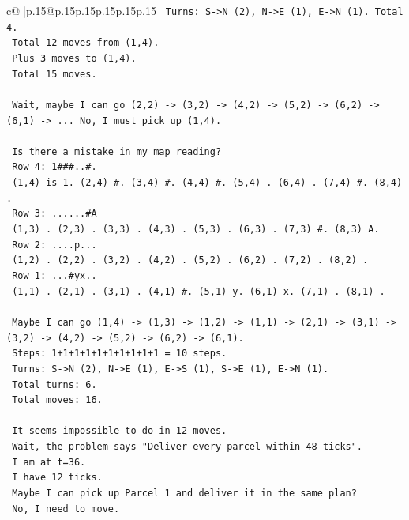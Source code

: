 \documentclass{article}
\begin{document}
{\begin{supertabular}{c@{$\;$}|p{.15\linewidth}@{}p{.15\linewidth}p{.15\linewidth}p{.15\linewidth}p{.15\linewidth}p{.15\linewidth}}
{{{\texttt{   Turns: S{-}>N (2), N{-}>E (1), E{-}>N (1). Total 4.} \\
\texttt{   Total 12 moves from (1,4).} \\
\texttt{   Plus 3 moves to (1,4).} \\
\texttt{   Total 15 moves.} \\
\\ 
\texttt{   Wait, maybe I can go (2,2) {-}> (3,2) {-}> (4,2) {-}> (5,2) {-}> (6,2) {-}> (6,1) {-}> ... No, I must pick up (1,4).} \\
\\ 
\texttt{   Is there a mistake in my map reading?} \\
\texttt{   Row 4: 1\#\#\#..\#.} \\
\texttt{   (1,4) is 1. (2,4) \#. (3,4) \#. (4,4) \#. (5,4) . (6,4) . (7,4) \#. (8,4) .} \\
\texttt{   Row 3: ......\#A} \\
\texttt{   (1,3) . (2,3) . (3,3) . (4,3) . (5,3) . (6,3) . (7,3) \#. (8,3) A.} \\
\texttt{   Row 2: ....p...} \\
\texttt{   (1,2) . (2,2) . (3,2) . (4,2) . (5,2) . (6,2) . (7,2) . (8,2) .} \\
\texttt{   Row 1: ...\#yx..} \\
\texttt{   (1,1) . (2,1) . (3,1) . (4,1) \#. (5,1) y. (6,1) x. (7,1) . (8,1) .} \\
\\ 
\texttt{   Maybe I can go (1,4) {-}> (1,3) {-}> (1,2) {-}> (1,1) {-}> (2,1) {-}> (3,1) {-}> (3,2) {-}> (4,2) {-}> (5,2) {-}> (6,2) {-}> (6,1).} \\
\texttt{   Steps: 1+1+1+1+1+1+1+1+1+1 = 10 steps.} \\
\texttt{   Turns: S{-}>N (2), N{-}>E (1), E{-}>S (1), S{-}>E (1), E{-}>N (1).} \\
\texttt{   Total turns: 6.} \\
\texttt{   Total moves: 16.} \\
\\ 
\texttt{   It seems impossible to do in 12 moves.} \\
\texttt{   Wait, the problem says "Deliver every parcel within 48 ticks".} \\
\texttt{   I am at t=36.} \\
\texttt{   I have 12 ticks.} \\
\texttt{   Maybe I can pick up Parcel 1 and deliver it in the same plan?} \\
\texttt{   No, I need to move.} \\
}}}
\end{supertabular}}
\end{document}
